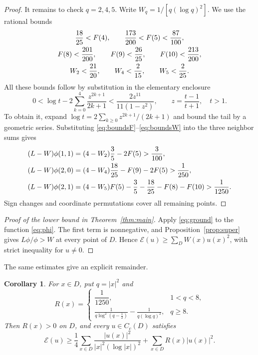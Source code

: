 \documentclass[11pt]{amsart}
\newtheorem{corollary}[theorem]{Corollary}
\numberwithin{equation}{section}
\newcommand{\E}{\mathcal E}
\newcommand{\Cc}{C_c}
\begin{document}
\begin{proof}
It remains to check $q=2,4,5$. Write $W_q=1/[q(\log q)^2]$.
We use the rational bounds
\begin{gather}
\frac{18}{25}<F(4),\qquad
\frac{173}{200}<F(5)<\frac{87}{100},\notag\\
F(8)<\frac{201}{200},\qquad F(9)<\frac{26}{25},\qquad
F(10)<\frac{213}{200},\label{eq:boundsF}\\
W_2<\frac{21}{20},\qquad W_4<\frac2{15},\qquad
W_5<\frac2{25}.\label{eq:boundsW}
\end{gather}
All these bounds follow by substitution in the elementary enclosure
\begin{equation}\label{eq:logcertificate}
0<\log t-2\sum_{k=0}^{4}\frac{z^{2k+1}}{2k+1}
<\frac{2z^{11}}{11(1-z^2)},
\qquad z=\frac{t-1}{t+1},\quad t>1.
\end{equation}
To obtain it, expand $\log t=2\sum_{k\ge0}z^{2k+1}/(2k+1)$
and bound the tail by a geometric series.
Substituting \eqref{eq:boundsF}--\eqref{eq:boundsW} into the
three neighbor sums gives
\begin{align}
(L-W)\phi(1,1)
&=(4-W_2)\frac35-2F(5)>\frac3{100},\notag\\
(L-W)\phi(2,0)
&=(4-W_4)\frac{18}{25}-F(9)-2F(5)>\frac1{250},\label{eq:local}\\
(L-W)\phi(2,1)
&=(4-W_5)F(5)-\frac35-\frac{18}{25}-F(8)-F(10)
>\frac1{1250}.\notag
\end{align}
Sign changes and coordinate permutations cover all remaining points.
\end{proof}

\begin{proof}[Proof of the lower bound in Theorem~\ref{thm:main}]
Apply \eqref{eq:ground} to the function \eqref{eq:phi}.
The first term is nonnegative, and Proposition~\ref{prop:super}
gives $L\phi/\phi>W$ at every point of $D$. Hence
$\E(u)\ge\sum_D W(x)u(x)^2$, with strict inequality for $u\ne0$.
\end{proof}

The same estimates give an explicit remainder.

\begin{corollary}\label{cor:remainder}
For $x\in D$, put $q=|x|^2$ and
\[
R(x)=
\begin{cases}
\dfrac1{1250},&1<q<8,\\[2mm]
\displaystyle\frac1{q\log^2(q-\frac12)}
-\frac1{q(\log q)^2},&q\ge8.
\end{cases}
\]
Then $R(x)>0$ on $D$, and every $u\in\Cc(D)$ satisfies
\begin{equation}\label{eq:remainder}
\E(u)\ge
\frac14\sum_{x\in D}\frac{|u(x)|^2}{|x|^2(\log|x|)^2}
+\sum_{x\in D}R(x)|u(x)|^2.
\end{equation}
\end{corollary}
\end{document}
